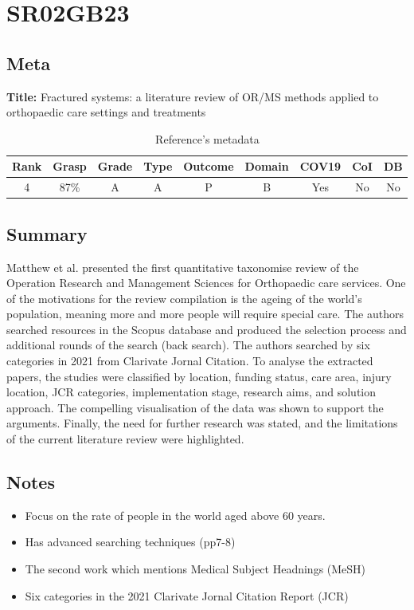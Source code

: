 \section{ SR02GB23 }


\subsection{Meta}

    \textbf{Title:}
    Fractured systems: a literature review of OR/MS methods applied to orthopaedic care settings and treatments

    \begin{table}[H]
        \centering
        \begin{tabular}{|c|c|c|c|c|c|c|c|c|}
            \hline
                \textbf{Rank} & \textbf{Grasp} & \textbf{Grade} & \textbf{Type} & \textbf{Outcome} & \textbf{Domain} & \textbf{COV19} & \textbf{CoI} & \textbf{DB} \\
            \hline
                4 & 87\% & A & A & P & B & Yes & No & No \\
            \hline
        \end{tabular}
        \caption{Reference's metadata}
        \label{tab:SR02GB23}
    \end{table}

\subsection{Summary}
    Matthew et al. presented the first quantitative taxonomise review of the Operation Research and Management Sciences for Orthopaedic care services. One of the motivations for the review compilation is the ageing of the world's population, meaning more and more people will require special care. The authors searched resources in the Scopus database and produced the selection process and additional rounds of the search (back search). The authors searched by six categories in 2021 from Clarivate Jornal Citation. To analyse the extracted papers, the studies were classified by location, funding status, care area, injury location, JCR categories, implementation stage, research aims, and solution approach. The compelling visualisation of the data was shown to support the arguments. Finally, the need for further research was stated, and the limitations of the current literature review were highlighted.
    

\subsection{Notes}
    \begin{itemize}
        \item Focus on the rate of people in the world aged above 60 years.
        \item Has advanced searching techniques (pp7-8)
        \item The second work which mentions Medical Subject Headnings (MeSH)
        \item Six categories in the 2021 Clarivate Jornal Citation Report (JCR)
    \end{itemize}


